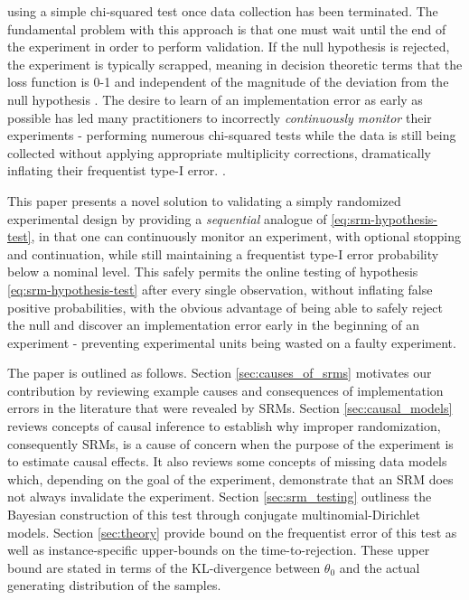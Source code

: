 \documentclass[11pt]{article}
\begin{document}
using a simple chi-squared test once data collection has been terminated. The fundamental problem with this approach is that one must wait until the end of the experiment in order to perform validation. If the null hypothesis is rejected, the experiment is typically scrapped, meaning in decision theoretic terms that the loss function is 0-1 and independent of the magnitude of the deviation from the null hypothesis . The desire to learn of an implementation error as early as possible has led many practitioners to incorrectly \textit{continuously monitor}  their experiments - performing numerous chi-squared tests while the data is still being collected without applying appropriate multiplicity corrections, dramatically inflating their frequentist type-I error. .

This paper presents a novel solution to validating a simply randomized experimental design by providing a \textit{sequential} analogue of \ref{eq:srm-hypothesis-test}, in that one can continuously monitor an experiment, with optional stopping and continuation, while still maintaining a frequentist type-I error probability below a nominal level. This safely permits the online testing of hypothesis \ref{eq:srm-hypothesis-test} after every single observation, without inflating false positive probabilities, with the obvious advantage of being able to safely reject the null and discover an implementation error early in the beginning of an experiment - preventing experimental units being wasted on a faulty experiment.

The paper is outlined as follows. Section \ref{sec:causes_of_srms} motivates our contribution by reviewing example causes and consequences of implementation errors in the literature that were revealed by SRMs. Section \ref{sec:causal_models} reviews concepts of causal inference to establish why improper randomization, consequently SRMs, is a cause of concern when the purpose of the experiment is to estimate causal effects. It also reviews some concepts of missing data models which, depending on the goal of the experiment, demonstrate that an SRM does not always invalidate the experiment. Section \ref{sec:srm_testing} outliness the Bayesian construction of this test through conjugate multinomial-Dirichlet models. Section \ref{sec:theory} provide bound on the frequentist error of this test as well as instance-specific upper-bounds on the time-to-rejection. These upper bound are stated in terms of the KL-divergence between $\theta_0$ and the actual generating distribution of the samples.
\end{document}
